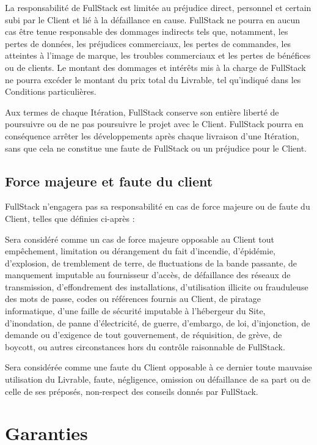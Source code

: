\documentclass[11pt]{article}
\begin{document}
La responsabilité de FullStack est limitée au préjudice direct, personnel et certain subi par le Client et lié à la défaillance en cause. FullStack ne pourra en aucun cas être tenue responsable des dommages indirects tels que, notamment, les pertes de données, les préjudices commerciaux, les pertes de commandes, les atteintes à l’image de marque, les troubles commerciaux et les pertes de bénéfices ou de clients. Le montant des dommages et intérêts mis à la charge de FullStack ne pourra excéder le montant du prix total du Livrable, tel qu’indiqué dans les Conditions particulières.

Aux termes de chaque Itération, FullStack conserve son entière liberté de poursuivre ou de ne pas poursuivre le projet avec le Client. FullStack pourra en conséquence arrêter les développements après chaque livraison d’une Itération, sans que cela ne constitue une faute de FullStack ou un préjudice pour le Client.

\subsection{Force majeure et faute du client}

FullStack n’engagera pas sa responsabilité en cas de force majeure ou de faute du Client, telles que définies ci-après :

Sera considéré comme un cas de force majeure opposable au Client tout empêchement, limitation ou dérangement du fait d’incendie, d’épidémie, d’explosion, de tremblement de terre, de fluctuations de la bande passante, de manquement imputable au fournisseur d’accès, de défaillance des réseaux de transmission, d’effondrement des installations, d’utilisation illicite ou frauduleuse des mots de passe, codes ou références fournis au Client, de piratage informatique, d’une faille de sécurité imputable à l’hébergeur du Site, d’inondation, de panne d’électricité, de guerre, d’embargo, de loi, d’injonction, de demande ou d’exigence de tout gouvernement, de réquisition, de grève, de boycott, ou autres circonstances hors du contrôle raisonnable de FullStack.

Sera considérée comme une faute du Client opposable à ce dernier toute mauvaise utilisation du Livrable, faute, négligence, omission ou défaillance de sa part ou de celle de ses préposés, non-respect des conseils donnés par FullStack.


\section{Garanties}
\end{document}
